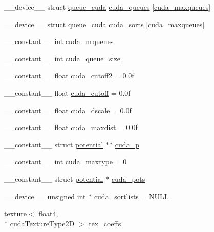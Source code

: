 \begin{DoxyCompactItemize}
\item 
\-\_\-\-\_\-device\-\_\-\-\_\- struct \hyperlink{structqueue__cuda}{queue\-\_\-cuda} \hyperlink{runner__cuda_8cu_a56ac3129073b30259da639ccb7f59039}{cuda\-\_\-queues} \mbox{[}\hyperlink{runner__cuda_8h_aee6e4ee4eb535be4b539353983efdef6}{cuda\-\_\-maxqueues}\mbox{]}
\item 
\-\_\-\-\_\-device\-\_\-\-\_\- struct \hyperlink{structqueue__cuda}{queue\-\_\-cuda} \hyperlink{runner__cuda_8cu_a27243fc18ae76301693c0cf9e1de4d16}{cuda\-\_\-sorts} \mbox{[}\hyperlink{runner__cuda_8h_aee6e4ee4eb535be4b539353983efdef6}{cuda\-\_\-maxqueues}\mbox{]}
\item 
\-\_\-\-\_\-constant\-\_\-\-\_\- int \hyperlink{runner__cuda_8cu_a72ce175a391d0819e319b612391afcf8}{cuda\-\_\-nrqueues}
\item 
\-\_\-\-\_\-constant\-\_\-\-\_\- int \hyperlink{runner__cuda_8cu_aedf21f3ce7ed33e1a27eb91f87e8035c}{cuda\-\_\-queue\-\_\-size}
\item 
\-\_\-\-\_\-constant\-\_\-\-\_\- float \hyperlink{runner__cuda_8cu_a2f0cb776d896068a04fa1ac16c764c87}{cuda\-\_\-cutoff2} = 0.\-0f
\item 
\-\_\-\-\_\-constant\-\_\-\-\_\- float \hyperlink{runner__cuda_8cu_ad237b5fd4f8529f32d2fecd27c801102}{cuda\-\_\-cutoff} = 0.\-0f
\item 
\-\_\-\-\_\-constant\-\_\-\-\_\- float \hyperlink{runner__cuda_8cu_ad3399eb242e27ceda517730bd00e6c5a}{cuda\-\_\-dscale} = 0.\-0f
\item 
\-\_\-\-\_\-constant\-\_\-\-\_\- float \hyperlink{runner__cuda_8cu_a14728b5d79f6d4c739246b839dd416c6}{cuda\-\_\-maxdist} = 0.\-0f
\item 
\-\_\-\-\_\-constant\-\_\-\-\_\- struct \hyperlink{structpotential}{potential} $\ast$$\ast$ \hyperlink{runner__cuda_8cu_a7a9f2a17f80b6789eb9ac6c2cd1ab118}{cuda\-\_\-p}
\item 
\-\_\-\-\_\-constant\-\_\-\-\_\- int \hyperlink{runner__cuda_8cu_ac0258954544fdb4a20f5bd7f9b7b40c0}{cuda\-\_\-maxtype} = 0
\item 
\-\_\-\-\_\-constant\-\_\-\-\_\- struct \hyperlink{structpotential}{potential} $\ast$ \hyperlink{runner__cuda_8cu_a1c76046250b64a69a6f09267f7d99320}{cuda\-\_\-pots}
\item 
\-\_\-\-\_\-device\-\_\-\-\_\- unsigned int $\ast$ \hyperlink{runner__cuda_8cu_a8f61841655b1d6ac66a33b9c58a9451b}{cuda\-\_\-sortlists} = N\-U\-L\-L
\item 
texture$<$ float4, \\*
cuda\-Texture\-Type2\-D $>$ \hyperlink{runner__cuda_8cu_ae2d751252687593dfcce55a03598e200}{tex\-\_\-coeffs}
$$
\end{DoxyCompactItemize}
